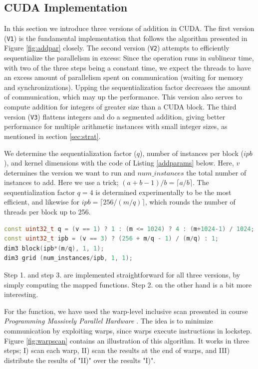 \subsection{CUDA Implementation}
\label{subsec:addcud}

In this section we introduce three versions of addition in CUDA. The first
version (\texttt{V1}) is the fundamental implementation that follows the
algorithm presented in Figure \ref{fig:addpar} closely. The second version
(\texttt{V2}) attempts to efficiently sequentialize the parallelism in excess:
Since the operation runs in sublinear time, with two of the three steps being a
constant time, we expect the threads to have an excess amount of parallelism
spent on communication (waiting for memory and synchronizations). Upping the
sequentialization factor decreases the amount of communication, which may up the
performance. This version also serves to compute addition for integers of
greater size than a CUDA block. The third version (\texttt{V3}) flattens
integers and do a segmented addition, giving better performance for multiple
arithmetic instances with small integer sizes, as mentioned in section
\ref{sec:strat}.

We determine the sequentialization factor ($q$), number of instances per block
($\mathit{ipb}$), and kernel dimensions with the code of Listing \ref{addparams}
below. Here, $v$ determines the version we want to run and
$\mathit{num\_instances}$ the total number of instances to add. Here we use a
trick; $(a + b - 1) / b = \lceil a / b \rceil$. The sequentialization factor
$q=4$ is determined experimentally to be the most efficient, and likewise for
$\mathit{ipb} = \lceil 256 / (m/q) \rceil$, which rounds the number of threads per block
up to 256.
\begin{lstlisting}[language=CPP,caption={CUDA addition parameters and kernel dimensions.},label={addparams}]
const uint32_t q = (v == 1) ? 1 : (m <= 1024) ? 4 : (m+1024-1) / 1024;
const uint32_t ipb = (v == 3) ? (256 + m/q - 1) / (m/q) : 1;
dim3 block(ipb*(m/q), 1, 1);
dim3 grid (num_instances/ipb, 1, 1);
\end{lstlisting}

Step 1. and step 3. are implemented straightforward for all three versions, by
simply computing the mapped functions. Step 2. on the other hand is a bit more
interesting.

For the  function, we have used the warp-level inclusive scan
presented in course \textit{Programming Massively Parallel Hardware}
\cite{PMPH}. The idea is to minimize communication by exploiting warps, since
warps execute instructions in lockstep. Figure \ref{fig:warpscan} contains an
illustration of this algorithm. It works in three steps; I) scan each warp, II)
scan the results at the end of warps, and III) distribute the results of "II)"
over the results "I)".

